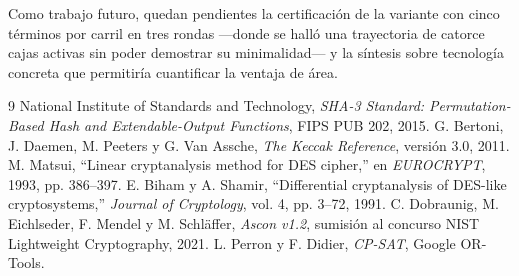 \documentclass[conference]{IEEEtran}
\begin{document}
Como trabajo futuro, quedan pendientes la certificación de la variante con cinco
términos por carril en tres rondas ---donde se halló una trayectoria de catorce
cajas activas sin poder demostrar su minimalidad--- y la síntesis sobre tecnología
concreta que permitiría cuantificar la ventaja de área.

\begin{thebibliography}{9}
 National Institute of Standards and Technology, \emph{SHA-3
Standard: Permutation-Based Hash and Extendable-Output Functions}, FIPS PUB 202,
2015.
 G. Bertoni, J. Daemen, M. Peeters y G. Van Assche, \emph{The
Keccak Reference}, versión 3.0, 2011.
 M. Matsui, ``Linear cryptanalysis method for DES cipher,'' en
\emph{EUROCRYPT}, 1993, pp. 386--397.
 E. Biham y A. Shamir, ``Differential cryptanalysis of DES-like
cryptosystems,'' \emph{Journal of Cryptology}, vol. 4, pp. 3--72, 1991.
 C. Dobraunig, M. Eichlseder, F. Mendel y M. Schläffer,
\emph{Ascon v1.2}, sumisión al concurso NIST Lightweight Cryptography, 2021.
 L. Perron y F. Didier, \emph{CP-SAT}, Google OR-Tools.
\end{thebibliography}
\end{document}
